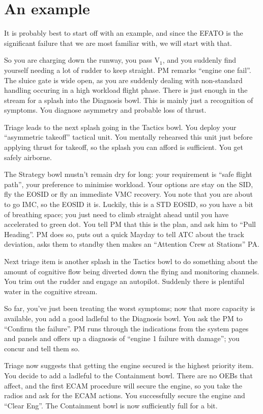 \documentclass[a5paper,11pt,titlepage]{article}
\begin{document}
\section{An example}

It is probably best to start off with an example, and since the EFATO is
the significant failure that we are most familiar with, we will start
with that.

So you are charging down the runway, you pass V$_1$, and you suddenly
find yourself needing a lot of rudder to keep straight. PM remarks
``engine one fail''. The sluice gate is wide open, as you are suddenly
dealing with non-standard handling occuring in a high workload flight
phase. There is just enough in the stream for a splash into the
Diagnosis bowl. This is mainly just a recognition of symptoms. You
diagnose asymmetry and probable loss of thrust.

Triage leads to the next splash going in the Tactics bowl. You deploy
your ``asymmetric takeoff'' tactical unit. You mentally rehearsed this
unit just before applying thrust for takeoff, so the splash you can
afford is sufficient. You get safely airborne.

The Strategy bowl mustn't remain dry for long: your requirement is
``safe flight path'', your preference to minimise workload. Your options
are stay on the SID, fly the EOSID or fly an immediate VMC recovery. You
note that you are about to go IMC, so the EOSID it is. Luckily, this is
a STD EOSID, so you have a bit of breathing space; you just need to
climb straight ahead until you have accelerated to green dot. You tell
PM that this is the plan, and ask him to ``Pull Heading''. PM does so,
puts out a quick Mayday to tell ATC about the track deviation, asks them
to standby then makes an ``Attention Crew at Stations'' PA.

Next triage item is another splash in the Tactics bowl to do something
about the amount of cognitive flow being diverted down the flying and
monitoring channels. You trim out the rudder and engage an
autopilot. Suddenly there is plentiful water in the cognitive stream.

So far, you've just been treating the worst symptoms; now that more
capacity is available, you add a good ladleful to the Diagnosis bowl.
You ask the PM to ``Confirm the failure''. PM runs through the
indications from the system pages and panels and offers up a diagnosis of
``engine 1 failure with damage''; you concur and tell them so.

Triage now suggests that getting the engine secured is the highest
priority item. You decide to add a ladleful to the Containment
bowl. There are no OEBs that affect, and the first ECAM procedure will
secure the engine, so you take the radios and ask for the ECAM
actions. You successfully secure the engine and ``Clear Eng''. The
Containment bowl is now sufficiently full for a bit.
\end{document}
